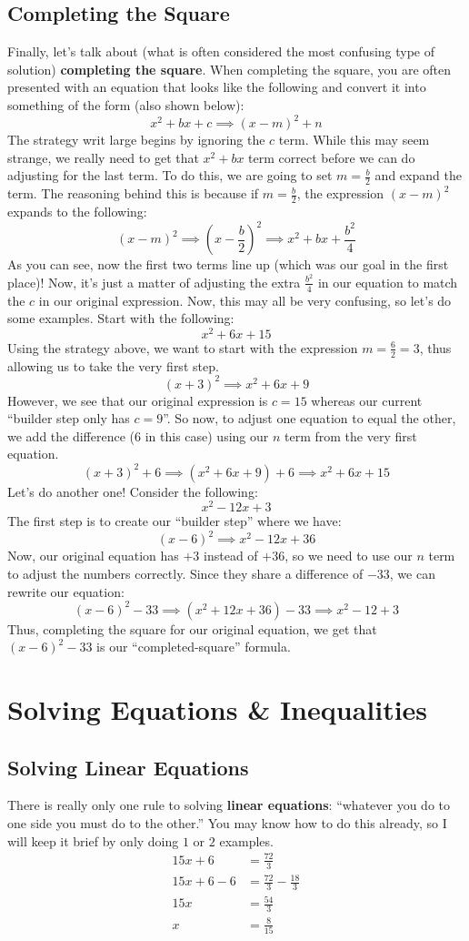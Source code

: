 \subsection{Completing the Square}
Finally, let's talk about (what is often considered the most confusing type of solution) \textbf{completing the square}. When completing the square, you are often presented with an equation that looks like the following and convert it into something of the form (also shown below):
$$
x^2 + bx + c \implies (x-m)^2 + n
$$
The strategy writ large begins by ignoring the $c$ term. While this may seem strange, we really need to get that $x^2 + bx$ term correct before we can do adjusting for the last term. To do this, we are going to set $m = \frac{b}{2}$ and expand the term. The reasoning behind this is because if $m= \frac{b}{2}$, the expression $(x-m)^2$ expands to the following:
$$
(x-m)^2 \implies \left(x-\frac{b}{2}\right)^2 \implies x^2 + bx + \frac{b^2}{4}
$$
As you can see, now the first two terms line up (which was our goal in the first place)! Now, it's just a matter of adjusting the extra $\frac{b^2}{4}$ in our equation to match the $c$ in our original expression. Now, this may all be very confusing, so let's do some examples. Start with the following:
$$
x^2 + 6x + 15  
$$
Using the strategy above, we want to start with the expression $m = \frac{6}{2} = 3$, thus allowing us to take the very first step.
$$
(x+3)^2 \implies x^2 + 6x + 9
$$
However, we see that our original expression is $c = 15$ whereas our current ``builder step only has $c = 9$''. So now, to adjust one equation to equal the other, we add the difference ($6$ in this case) using our $n$ term from the very first equation.
$$
(x+3)^2 + 6 \implies (x^2 + 6x + 9) + 6 \implies x^2 + 6x + 15
$$
Let's do another one! Consider the following:
$$
x^2 - 12x + 3
$$
The first step is to create our ``builder step'' where we have:
$$
(x-6)^2 \implies x^2 -12x + 36 
$$
Now, our original equation has $+3$ instead of $+36$, so we need to use our $n$ term to adjust the numbers correctly. Since they share a difference of $-33$, we can rewrite our equation:
$$
(x-6)^2 - 33 \implies (x^2 + 12x + 36) - 33 \implies x^2 - 12 + 3
$$
Thus, completing the square for our original equation, we get that $(x-6)^2 - 33$ is our ``completed-square'' formula.
\section{Solving Equations \& Inequalities}
\subsection{Solving Linear Equations}
There is really only one rule to solving \textbf{linear equations}: ``whatever you do to one side you must do to the other.'' You may know how to do this already, so I will keep it brief by only doing $1$ or $2$ examples.
\begin{align*}
    15x + 6 &= \frac{72}{3}\\
    15x + 6 - 6 &= \frac{72}{3} - \frac{18}{3}\\
    15x &= \frac{54}{3}\\
    x &= \frac{8}{15}
\end{align*}
